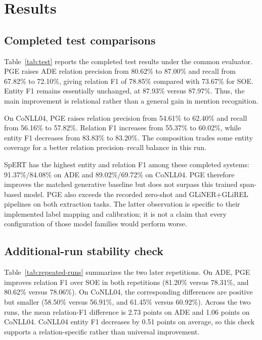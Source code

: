 \documentclass[preprint,12pt]{elsarticle}
\begin{document}
\section{Results}
\label{sec:results}
\subsection{Completed test comparisons}
Table~\ref{tab:test} reports the completed test results under the common
evaluator. PGE raises ADE relation precision from 80.62\% to 87.00\% and
recall from 67.82\% to 72.10\%, giving relation F1 of 78.85\% compared with
73.67\% for SOE. Entity F1 remains essentially unchanged, at 87.93\% versus
87.97\%. Thus, the main improvement is relational rather than a general gain
in mention recognition.

On CoNLL04, PGE raises relation precision from 54.61\% to 62.40\% and recall
from 56.16\% to 57.82\%. Relation F1 increases from 55.37\% to 60.02\%, while
entity F1 decreases from 83.83\% to 83.20\%. The composition trades some
entity coverage for a better relation precision--recall balance in this run.

\begin{table}[htbp]
\centering\scriptsize\setlength{\tabcolsep}{2.6pt}
\caption{Completed test comparisons, strict source-character-span
micro scores (\%). Qwen3-ZS is Qwen3-4B zero-shot with the recorded verifier;
GLiNER+GLiREL uses training-only calibration. Each dataset uses its own test
partition. All rows are rescored with the same evaluator.}
\label{tab:test}

\end{table}

SpERT has the highest entity and relation F1 among these completed systems:
91.37\%/84.08\% on ADE and 89.02\%/69.72\% on CoNLL04. PGE therefore improves
the matched generative baseline but does not surpass this trained span-based
model. PGE also exceeds the recorded zero-shot and GLiNER+GLiREL pipelines on
both extraction tasks. The latter observation is specific to their implemented
label mapping and calibration; it is not a claim that every configuration of
those model families would perform worse.

\subsection{Additional-run stability check}
Table~\ref{tab:repeated-runs} summarizes the two later repetitions. On ADE, PGE
improves relation F1 over SOE in both repetitions (81.20\% versus 78.31\%, and
80.62\% versus 78.06\%). On CoNLL04, the corresponding differences are positive
but smaller (58.50\% versus 56.91\%, and 61.45\% versus 60.92\%). Across the two
runs, the mean relation-F1 difference is 2.73 points on ADE and
1.06 points on CoNLL04. CoNLL04 entity F1 decreases by 0.51 points on average,
so this check supports a relation-specific rather than universal improvement.
\end{document}
